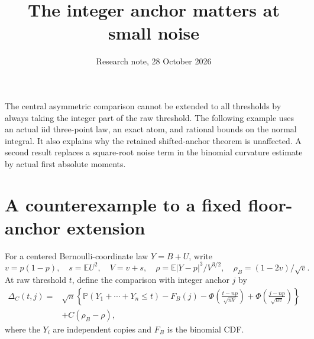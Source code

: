 \documentclass[11pt,a4paper]{article}
\title{The integer anchor matters at small noise}
\author{Research note, 28 October 2026}\date{}
\newcommand{\E}{\mathbb E}\newcommand{\Pp}{\mathbb P}
\begin{document}
\maketitle

The central asymmetric comparison cannot be extended to all thresholds by
always taking the integer part of the raw threshold. The following example
uses an actual iid three-point law, an exact atom, and rational bounds on the
normal integral. It also explains why the retained shifted-anchor theorem
is unaffected. A second result replaces a square-root noise term in the
binomial curvature estimate by actual first absolute moments.

\section{A counterexample to a fixed floor-anchor extension}
For a centered Bernoulli-coordinate law $Y=B+U$, write
\[
 v=p(1-p),\quad s=\E U^2,\quad V=v+s,\quad
 \rho=\E|Y-p|^3/V^{3/2},\quad \rho_B=(1-2v)/\sqrt v.
\]
At raw threshold $t$, define the comparison with integer anchor $j$ by
\begin{align*}
 \Delta_C(t,j)={}&\sqrt n\left\{\Pp(Y_1+\cdots+Y_n\le t)-F_B(j)
 -\Phi\!\left(\frac{t-np}{\sqrt{nV}}\right)
 +\Phi\!\left(\frac{j-np}{\sqrt{nv}}\right)\right\}\\
 &+C(\rho_B-\rho),
\end{align*}
where the $Y_i$ are independent copies and $F_B$ is the binomial CDF.
\end{document}
